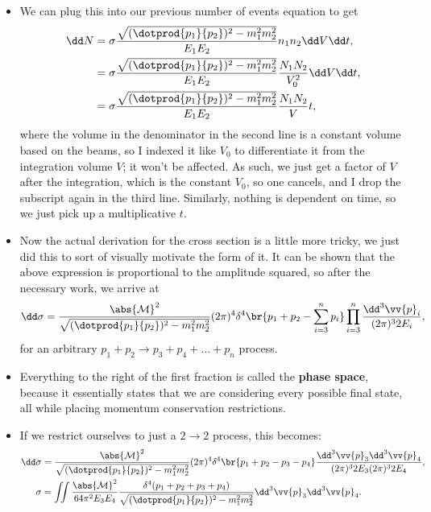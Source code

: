 \begin{itemize}
    \item We can plug this into our previous number of events equation to get
        \begin{align*}
            \dd N &= \sigma \frac{\sqrt{(\dotprod{p_1}{p_2})^2 - m_1^2m_2^2}}{E_1E_2} n_1n_2 \dd V \dd t, \\
            &= \sigma \frac{\sqrt{(\dotprod{p_1}{p_2})^2 - m_1^2m_2^2}}{E_1E_2} \frac{N_1N_2}{V_0^2}\dd V \dd t, \\
            &= \sigma \frac{\sqrt{(\dotprod{p_1}{p_2})^2 - m_1^2m_2^2}}{E_1E_2} \frac{N_1N_2}{V}t,
        \end{align*}
        where the volume in the denominator in the second line is a constant volume based on the beams, so I indexed it like $V_0$ to differentiate it from the integration volume $V$; it won't be affected. As such, we just get a factor of $V$ after the integration, which is the constant $V_0$, so one cancels, and I drop the subscript again in the third line. Similarly, nothing is dependent on time, so we just pick up a multiplicative $t$.
    \item Now the actual derivation for the cross section is a little more tricky, we just did this to sort of visually motivate the form of it. It can be shown that the above expression is proportional to the amplitude squared, so after the necessary work, we arrive at
        \begin{equation}
            \dd\sigma = \frac{\abs{\mathcal{M}}^2}{\sqrt{(\dotprod{p_1}{p_2})^2 - m_1^2m_2^2}} (2\pi)^4 \delta^4\br{p_1+p_2 - \sum_{i=3}^{n}p_i} \prod_{i=3}^n \frac{\dd^3\vv{p}_i}{(2\pi)^3 2E_i},
        \end{equation}
        for an arbitrary $p_1 + p_2 \rightarrow p_3 + p_4 + \ldots + p_n$ process.
    \item Everything to the right of the first fraction is called the \textbf{phase space}, because it essentially states that we are considering every possible final state, all while placing momentum conservation restrictions.
    \item If we restrict ourselves to just a $2\rightarrow2$ process, this becomes:
        \begin{align*}
            \dd\sigma &= \frac{\abs{\mathcal{M}}^2}{\sqrt{(\dotprod{p_1}{p_2})^2 - m_1^2m_2^2}} (2\pi)^4 \delta^4\br{p_1 + p_2 - p_3 - p_4} \frac{\dd^3\vv{p}_3\dd^3\vv{p}_4}{(2\pi)^3 2E_3 (2\pi)^3 2E_4}, \\
            \sigma &= \iint \frac{\abs{\mathcal{M}}^2}{64\pi^2 E_3E_4} \frac{\delta^4(p_1 + p_2 + p_3 + p_4)}{\sqrt{(\dotprod{p_1}{p_2})^2 - m_1^2m_2^2}} \dd^3\vv{p}_3 \dd^3\vv{p}_4.

\end{align*}
\end{itemize}
